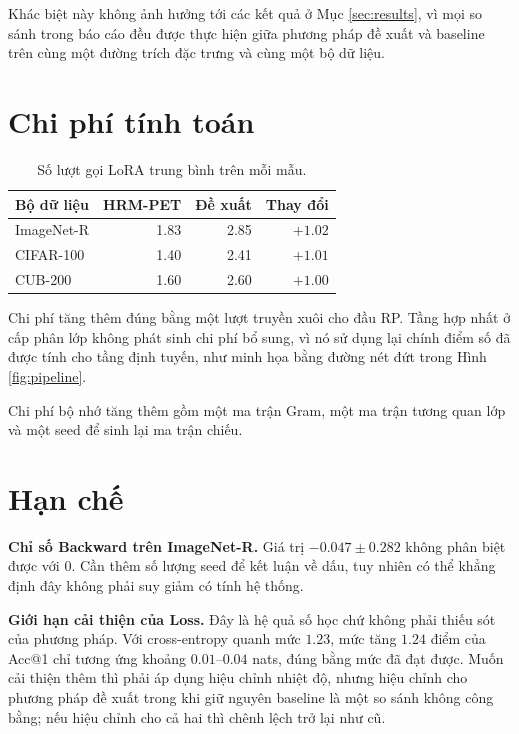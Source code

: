 \documentclass[11pt,a4paper]{article}
\begin{document}
Khác biệt này không ảnh hưởng tới các kết quả ở Mục \ref{sec:results}, vì mọi so
sánh trong báo cáo đều được thực hiện giữa phương pháp đề xuất và baseline trên
cùng một đường trích đặc trưng và cùng một bộ dữ liệu.


\section{Chi phí tính toán}

\begin{table}[htbp]
\centering
\caption{Số lượt gọi LoRA trung bình trên mỗi mẫu.}
\label{tab:cost}
\begin{tabular}{lrrr}
\toprule
Bộ dữ liệu & HRM-PET & Đề xuất & Thay đổi \\
\midrule
ImageNet-R & 1.83 & 2.85 & $+1.02$ \\
CIFAR-100  & 1.40 & 2.41 & $+1.01$ \\
CUB-200    & 1.60 & 2.60 & $+1.00$ \\
\bottomrule
\end{tabular}
\end{table}

Chi phí tăng thêm đúng bằng một lượt truyền xuôi cho đầu RP. Tầng hợp nhất ở cấp
phân lớp không phát sinh chi phí bổ sung, vì nó sử dụng lại chính điểm số đã
được tính cho tầng định tuyến, như minh họa bằng đường nét đứt trong Hình
\ref{fig:pipeline}.

Chi phí bộ nhớ tăng thêm gồm một ma trận Gram, một ma trận tương quan lớp và một
seed để sinh lại ma trận chiếu.

\section{Hạn chế}
\label{sec:limits}

\textbf{Chỉ số Backward trên ImageNet-R.} Giá trị $-0.047 \pm 0.282$ không phân
biệt được với $0$. Cần thêm số lượng seed để kết luận về dấu, tuy nhiên có thể
khẳng định đây không phải suy giảm có tính hệ thống.

\textbf{Giới hạn cải thiện của Loss.} Đây là hệ quả số học chứ không phải thiếu
sót của phương pháp. Với cross-entropy quanh mức $1.23$, mức tăng $1.24$ điểm
của Acc@1 chỉ tương ứng khoảng $0.01$--$0.04$ nats, đúng bằng mức đã đạt được.
Muốn cải thiện thêm thì phải áp dụng hiệu chỉnh nhiệt độ, nhưng hiệu chỉnh cho
phương pháp đề xuất trong khi giữ nguyên baseline là một so sánh không công
bằng; nếu hiệu chỉnh cho cả hai thì chênh lệch trở lại như cũ.
\end{document}
